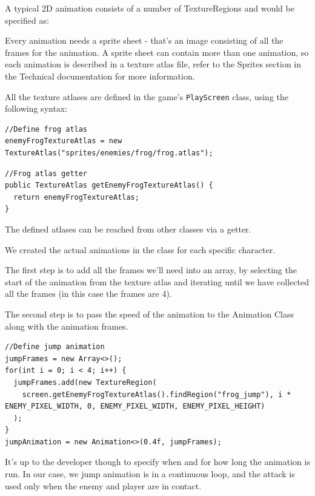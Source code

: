 \documentclass[12p]{article}
\begin{document}
A typical 2D animation consists of a number of TextureRegions and would be specified as:


Every animation needs a sprite sheet - that's an image consisting of all the frames for the animation. A sprite sheet can contain more than one animation, so each animation is described in a texture atlas file, refer to the Sprites section in the Technical documentation for more information. 

All the texture atlases are defined in the game's \texttt{PlayScreen} class, using the following syntax:

\begin{verbatim}
//Define frog atlas
enemyFrogTextureAtlas = new TextureAtlas("sprites/enemies/frog/frog.atlas");
\end{verbatim}

\begin{verbatim}
//Frog atlas getter
public TextureAtlas getEnemyFrogTextureAtlas() {
  return enemyFrogTextureAtlas;
}
\end{verbatim}

The defined atlases can be reached from other classes via a getter.

We created the actual animations in the class for each specific character. 

The first step is to add all the frames we'll need into an array, by selecting the start of the animation from the texture atlas and iterating until we have collected all the frames (in this case the frames are 4).

The second step is to pass the speed of the animation to the Animation Class along with the animation frames.

\begin{verbatim}
//Define jump animation
jumpFrames = new Array<>();
for(int i = 0; i < 4; i++) {
  jumpFrames.add(new TextureRegion(
    screen.getEnemyFrogTextureAtlas().findRegion("frog_jump"), i * ENEMY_PIXEL_WIDTH, 0, ENEMY_PIXEL_WIDTH, ENEMY_PIXEL_HEIGHT)
  );
}
jumpAnimation = new Animation<>(0.4f, jumpFrames);
\end{verbatim}

It's up to the developer though to specify when and for how long the animation is run. In our case, we jump animation is in a continuous loop, and the attack is used only when the enemy and player are in contact.
\end{document}
